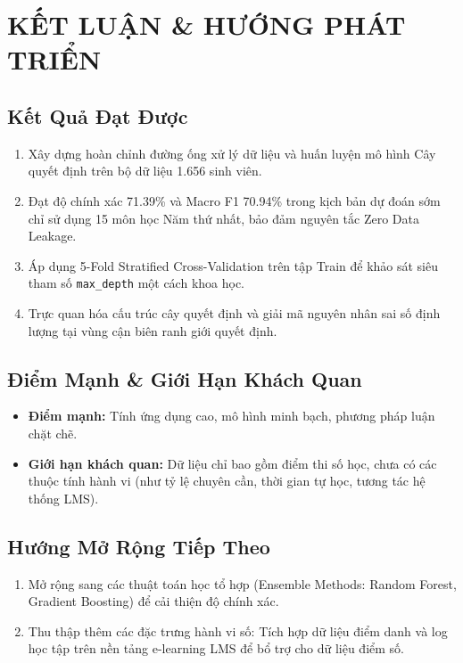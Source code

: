 \documentclass[12pt,a4paper]{article}
\begin{document}
\newpage
\section{KẾT LUẬN \& HƯỚNG PHÁT TRIỂN}

\subsection{Kết Quả Đạt Được}
\begin{enumerate}
    \item Xây dựng hoàn chỉnh đường ống xử lý dữ liệu và huấn luyện mô hình Cây quyết định trên bộ dữ liệu 1.656 sinh viên.
    \item Đạt độ chính xác 71.39\% và Macro F1 70.94\% trong kịch bản dự đoán sớm chỉ sử dụng 15 môn học Năm thứ nhất, bảo đảm nguyên tắc Zero Data Leakage.
    \item Áp dụng 5-Fold Stratified Cross-Validation trên tập Train để khảo sát siêu tham số \texttt{max\_depth} một cách khoa học.
    \item Trực quan hóa cấu trúc cây quyết định và giải mã nguyên nhân sai số định lượng tại vùng cận biên ranh giới quyết định.
\end{enumerate}

\subsection{Điểm Mạnh \& Giới Hạn Khách Quan}
\begin{itemize}
    \item \textbf{Điểm mạnh:} Tính ứng dụng cao, mô hình minh bạch, phương pháp luận chặt chẽ.
    \item \textbf{Giới hạn khách quan:} Dữ liệu chỉ bao gồm điểm thi số học, chưa có các thuộc tính hành vi (như tỷ lệ chuyên cần, thời gian tự học, tương tác hệ thống LMS).
\end{itemize}

\subsection{Hướng Mở Rộng Tiếp Theo}
\begin{enumerate}
    \item Mở rộng sang các thuật toán học tổ hợp (Ensemble Methods: Random Forest, Gradient Boosting) để cải thiện độ chính xác.
    \item Thu thập thêm các đặc trưng hành vi số: Tích hợp dữ liệu điểm danh và log học tập trên nền tảng e-learning LMS để bổ trợ cho dữ liệu điểm số.
\end{enumerate}
\end{document}

